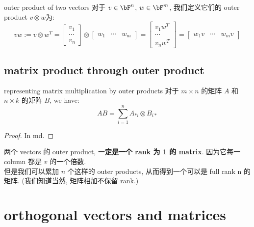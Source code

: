 \documentclass[lang=cn,11pt]{elegantbook}
\begin{document}
\begin{definition}{outer product of two vectors}
    对于 $v \in \bF^n$, $w \in \bF^m$, 我们定义它们的 outer product $v \otimes w$为:
    $$
    v w := v \otimes w^T = \begin{bmatrix} v_{1}  \\ \cdots  \\v_{n} \end{bmatrix} \otimes\begin{bmatrix} w_{1}  & \cdots  &w_{m} \end{bmatrix} = \begin{bmatrix} v_{1}w^T  \\ \cdots  \\v_{n}w^T \end{bmatrix} = \begin{bmatrix} w_{1}v  & \cdots  &w_{m}v \end{bmatrix}
    $$
\end{definition}

\section{matrix product through outer product}

\begin{theorem}{representing matrix multiplication by outer products}
对于 $m\times n$ 的矩阵 $A$ 和 $n \times k$ 的矩阵 $B$, we have:
\begin{equation}
    A B = \sum_{i=1}^n A_{*i} \otimes B _{i*}
\end{equation}
\end{theorem}
\begin{proof}
    In md.
\end{proof}
\begin{remark}
    两个 vectors 的 outer product, 一\textbf{定是一个 rank 为 1 的 matrix}. 因为它每一 column 都是 $v$ 的一个倍数.\\
    但是我们可以累加 $n$ 个这样的 outer products, 从而得到一个可以是 full rank n 的矩阵. (我们知道当然, 矩阵相加不保留 rank.)
\end{remark}


\chapter{orthogonal vectors and matrices}
\end{document}
